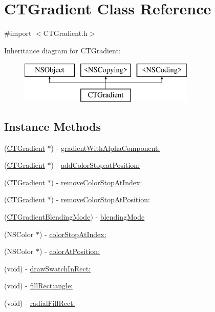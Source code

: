 \hypertarget{interface_c_t_gradient}{\section{C\-T\-Gradient Class Reference}
\label{interface_c_t_gradient}
}


{\ttfamily \#import $<$C\-T\-Gradient.\-h$>$}

Inheritance diagram for C\-T\-Gradient\-:\begin{figure}[H]
\begin{center}
\leavevmode
\includegraphics[height=2.000000cm]{interface_c_t_gradient}
\end{center}
\end{figure}
\subsection*{Instance Methods}
\begin{DoxyCompactItemize}
\item 
(\hyperlink{interface_c_t_gradient}{C\-T\-Gradient} $\ast$) -\/ \hyperlink{interface_c_t_gradient_a9711a9a4ff8add6a23d87769d571a29c}{gradient\-With\-Alpha\-Component\-:}
\item 
(\hyperlink{interface_c_t_gradient}{C\-T\-Gradient} $\ast$) -\/ \hyperlink{interface_c_t_gradient_add5c797a7dacc15ee15ebec459ab0c12}{add\-Color\-Stop\-:at\-Position\-:}
\item 
(\hyperlink{interface_c_t_gradient}{C\-T\-Gradient} $\ast$) -\/ \hyperlink{interface_c_t_gradient_ac603f8a4b37a9b4151ca6dd123c3bb1e}{remove\-Color\-Stop\-At\-Index\-:}
\item 
(\hyperlink{interface_c_t_gradient}{C\-T\-Gradient} $\ast$) -\/ \hyperlink{interface_c_t_gradient_ac1efa958cfd3df2e0fdecc78b7f41a07}{remove\-Color\-Stop\-At\-Position\-:}
\item 
(\hyperlink{_c_t_gradient_8h_ace00a9b95be98321b1032d647d97aa73}{C\-T\-Gradient\-Blending\-Mode}) -\/ \hyperlink{interface_c_t_gradient_a12ca8c1a18621b2c7228da50f059c9cd}{blending\-Mode}
\item 
(N\-S\-Color $\ast$) -\/ \hyperlink{interface_c_t_gradient_ad79db8e680b13ec89c5f98473f15135e}{color\-Stop\-At\-Index\-:}
\item 
(N\-S\-Color $\ast$) -\/ \hyperlink{interface_c_t_gradient_a68e922c4466b011a5cc1091854921b3d}{color\-At\-Position\-:}
\item 
(void) -\/ \hyperlink{interface_c_t_gradient_ae93d45551021b9a064178de18053df6e}{draw\-Swatch\-In\-Rect\-:}
\item 
(void) -\/ \hyperlink{interface_c_t_gradient_a8a5da003350e2d5e07a95b5c2ac585c0}{fill\-Rect\-:angle\-:}
\item 
(void) -\/ \hyperlink{interface_c_t_gradient_ae0f0b59e6a122f7a1c7c89a80dc27f9b}{radial\-Fill\-Rect\-:}
\end{DoxyCompactItemize}
